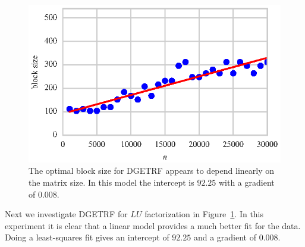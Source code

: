 \documentclass[a4paper,12pt]{article}
\begin{document}
\begin{figure}[ht]
  \centering
  \includegraphics[scale=1]{fig/curvefit_linear.eps}
  \caption{The optimal block size for DGETRF appears to depend
    linearly on the matrix size. In this model the intercept is
    $92.25$ with a gradient of $0.008$.}
  \label{fig.fit_linear}
\end{figure}
Next we investigate DGETRF for $LU$ factorization
in Figure~\ref{fig.fit_linear}.
In this experiment it is clear that a linear model
provides a much better fit for the data.
Doing a least-squares fit gives an intercept of $92.25$
and a gradient of $0.008$.
\end{document}

